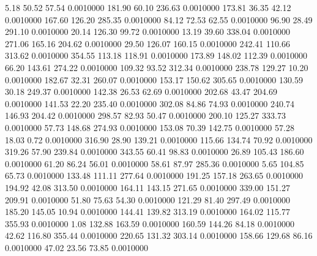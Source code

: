    5.18   50.52   57.54   0.0010000
 181.90   60.10  236.63   0.0010000
 173.81   36.35   42.12   0.0010000
 167.60  126.20  285.35   0.0010000
  84.12   72.53   62.55   0.0010000
  96.90   28.49  291.10   0.0010000
  20.14  126.30   99.72   0.0010000
  13.19   39.60  338.04   0.0010000
 271.06  165.16  204.62   0.0010000
  29.50  126.07  160.15   0.0010000
 242.41  110.66  313.62   0.0010000
 354.55  113.18  118.91   0.0010000
 173.89  148.02  112.39   0.0010000
  66.20  143.61  274.22   0.0010000
 109.32   93.52  312.34   0.0010000
 238.78  129.27   10.20   0.0010000
 182.67   32.31  260.07   0.0010000
 153.17  150.62  305.65   0.0010000
 130.59   30.18  249.37   0.0010000
 142.38   26.53   62.69   0.0010000
 202.68   43.47  204.69   0.0010000
 141.53   22.20  235.40   0.0010000
 302.08   84.86   74.93   0.0010000
 240.74  146.93  204.42   0.0010000
 298.57   82.93   50.47   0.0010000
 200.10  125.27  333.73   0.0010000
  57.73  148.68  274.93   0.0010000
 153.08   70.39  142.75   0.0010000
  57.28   18.03    0.72   0.0010000
 316.90   28.90  139.21   0.0010000
 115.66  134.74   70.92   0.0010000
 319.26   57.90  239.84   0.0010000
 343.55   60.41   98.83   0.0010000
  26.89  105.43  186.60   0.0010000
  61.20   86.24   56.01   0.0010000
  58.61   87.97  285.36   0.0010000
   5.65  104.85   65.73   0.0010000
 133.48  111.11  277.64   0.0010000
 191.25  157.18  263.65   0.0010000
 194.92   42.08  313.50   0.0010000
 164.11  143.15  271.65   0.0010000
 339.00  151.27  209.91   0.0010000
  51.80   75.63   54.30   0.0010000
 121.29   81.40  297.49   0.0010000
 185.20  145.05   10.94   0.0010000
 144.41  139.82  313.19   0.0010000
 164.02  115.77  355.93   0.0010000
   1.08  132.88  163.59   0.0010000
 160.59  144.26   84.18   0.0010000
  42.62  116.80  355.44   0.0010000
 220.65  131.32  303.14   0.0010000
 158.66  129.68   86.16   0.0010000
  47.02   23.56   73.85   0.0010000
